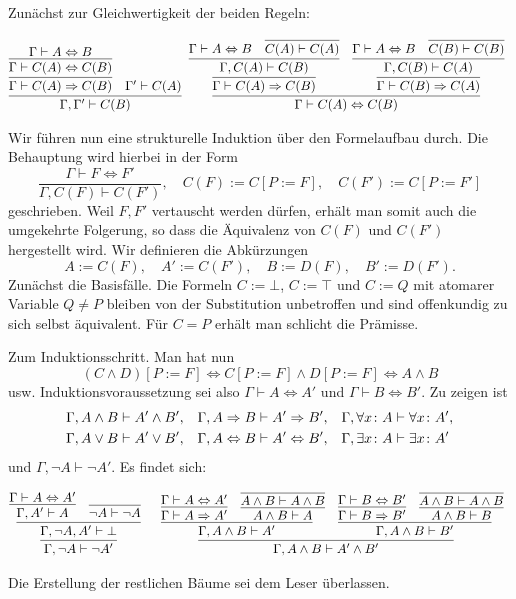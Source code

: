\begin{Beweis}
Zunächst zur Gleichwertigkeit der beiden Regeln:
\begin{small}
\[
\begin{array}{@{}l@{\;\;}l}
\infer{\Gamma,\Gamma'\vdash C(B)}{
  \infer{\Gamma\vdash C(A)\cond C(B)}{
    \infer{\Gamma\vdash C(A)\bicond C(B)}{
      \Gamma\vdash A\bicond B}}
& \Gamma'\vdash C(A)}
&
\infer{\Gamma\vdash C(A)\bicond C(B)}{
  \infer{\Gamma\vdash C(A)\cond C(B)}{
    \infer{\Gamma, C(A)\vdash C(B)}{
      \Gamma\vdash A\bicond B
    & \infer{C(A)\vdash C(A)}{}}}
& \infer{\Gamma\vdash C(B)\cond C(A)}{
    \infer{\Gamma, C(B)\vdash C(A)}{
      \Gamma\vdash A\bicond B
    & \infer{C(B)\vdash C(B)}{}}}}
\end{array}
\]
\end{small}%
Wir führen nun eine strukturelle Induktion über den Formelaufbau durch.
Die Behauptung wird hierbei in der Form
\[\dfrac{\Gamma\vdash F\Leftrightarrow F'}{
\Gamma,C(F)\vdash C(F')},\quad C(F) := C[P:=F],\quad C(F') := C[P:=F']\]
geschrieben. Weil $F,F'$ vertauscht werden dürfen, erhält man somit auch
die umgekehrte Folgerung, so dass die Äquivalenz von $C(F)$ und $C(F')$
hergestellt wird. Wir definieren die Abkürzungen
\[A := C(F),\quad A' := C(F'),\quad B := D(F),\quad B' := D(F').\]
Zunächst die Basisfälle. Die Formeln $C:=\bot$,
$C:=\top$ und $C:=Q$ mit atomarer Variable $Q\ne P$
bleiben von der Substitution unbetroffen und sind offenkundig zu sich
selbst äquivalent. Für $C=P$ erhält man schlicht die Prämisse.

Zum Induktionsschritt. Man hat nun
\[(C\land D)[P:=F]
\iff C[P:=F]\land D[P:=F]\iff A\land B\]
usw. Induktionsvoraussetzung sei also $\Gamma\vdash A\Leftrightarrow A'$
und $\Gamma\vdash B\Leftrightarrow B'$. Zu zeigen ist
\begin{align*}
& \Gamma,A\land B\vdash A'\land B',
&& \Gamma,A\Rightarrow B\vdash A'\Rightarrow B',
&& \Gamma,\forall x\colon A\vdash\forall x\colon A',\\
& \Gamma,A\lor B\vdash A'\lor B',
&& \Gamma,A\Leftrightarrow B\vdash A'\Leftrightarrow B',
&& \Gamma,\exists x\colon A\vdash\exists x\colon A'
\end{align*}
und $\Gamma,\lnot A\vdash\lnot A'$. Es findet sich:
\begin{small}
\[
\begin{array}{@{}l@{\quad\;\;}l}
\infer{\Gamma,\lnot A\vdash\lnot A'}{
  \infer{\Gamma,\lnot A,A'\vdash\bot}{
    \infer{\Gamma,A'\vdash A}{\Gamma\vdash A\bicond A'}
  & \infer{\lnot A\vdash\lnot A}{}}}
&
\infer{\Gamma,A\land B\vdash A'\land B'}{
  \infer{\Gamma,A\land B\vdash A'}{
    \infer{\Gamma\vdash A\cond A'}{\Gamma\vdash A\bicond A'}
  & \infer{A\land B\vdash A}{
      \infer{A\land B\vdash A\land B}{}}}
& \infer{\Gamma,A\land B\vdash B'}{
    \infer{\Gamma\vdash B\cond B'}{\Gamma\vdash B\bicond B'}
  & \infer{A\land B\vdash B}{
      \infer{A\land B\vdash A\land B}{}}}}
\end{array}
\]
\end{small}%
Die Erstellung der restlichen Bäume sei dem Leser überlassen.


\end{Beweis}
